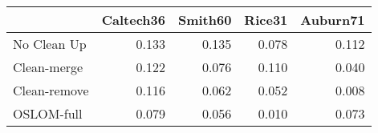 \begin{tabular}{lrrrr}
\toprule
{} & Caltech36 & Smith60 & Rice31 & Auburn71 \\
\midrule
No Clean Up  &     0.133 &   0.135 &  0.078 &    0.112 \\
Clean-merge  &     0.122 &   0.076 &  0.110 &    0.040 \\
Clean-remove &     0.116 &   0.062 &  0.052 &    0.008 \\
OSLOM-full   &     0.079 &   0.056 &  0.010 &    0.073 \\
\bottomrule
\end{tabular}
